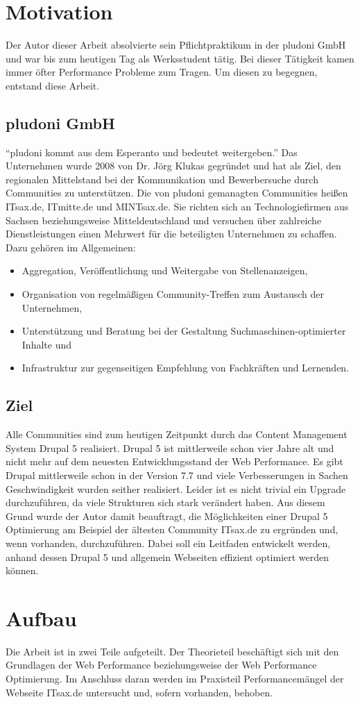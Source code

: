 \section{Motivation}
Der Autor dieser Arbeit absolvierte sein Pflichtpraktikum in der pludoni GmbH und war bis zum heutigen Tag als Werksstudent tätig. Bei dieser T\"atigkeit kamen immer \"ofter Performance Probleme zum Tragen. Um diesen zu begegnen, entstand diese Arbeit.
\subsection{pludoni GmbH}
“pludoni kommt aus dem Esperanto und bedeutet weitergeben.”
Das Unternehmen wurde 2008 von Dr. Jörg Klukas gegründet und hat als Ziel, den regionalen Mittelstand bei der Kommunikation und Bewerbersuche durch Communities zu unterstützen. Die von pludoni gemanagten Communities heißen ITsax.de, ITmitte.de und MINTsax.de. Sie richten sich an Technologiefirmen aus Sachsen beziehungsweise Mitteldeutschland und versuchen über zahlreiche Dienstleistungen einen Mehrwert für die beteiligten Unternehmen zu schaffen. Dazu geh\"oren im Allgemeinen:

\begin{itemize}
 \item Aggregation, Veröffentlichung und Weitergabe von Stellenanzeigen,
 \item Organisation von regelmäßigen Community-Treffen zum Austausch der Unternehmen,
 \item Unterstützung und Beratung bei der Gestaltung Suchmaschinen-optimierter Inhalte und
 \item Infrastruktur zur gegenseitigen Empfehlung von Fachkräften und Lernenden.
\end{itemize}

\subsection{Ziel}
Alle Communities sind zum heutigen Zeitpunkt durch das Content Management System Drupal 5 realisiert. Drupal 5 ist mittlerweile schon vier Jahre alt und nicht mehr auf dem neuesten Entwicklungsstand der Web Performance. Es gibt Drupal mittlerweile schon in der Version 7.7 und viele Verbesserungen in Sachen Geschwindigkeit wurden seither realisiert. Leider ist es nicht trivial ein Upgrade durchzuführen, da viele Strukturen sich stark verändert haben. Aus diesem Grund wurde der Autor damit beauftragt, die Möglichkeiten einer Drupal 5 Optimierung am Beispiel der ältesten Community ITsax.de zu ergründen und, wenn vorhanden, durchzuführen. Dabei soll ein Leitfaden entwickelt werden, anhand dessen Drupal 5 und allgemein Webseiten effizient optimiert werden können.

\section{Aufbau}
Die Arbeit ist in zwei Teile aufgeteilt. Der Theorieteil beschäftigt sich mit den Grundlagen der Web Performance beziehungsweise der Web Performance Optimierung. Im Anschluss daran werden im Praxisteil Performancemängel der Webseite ITsax.de untersucht und, sofern vorhanden, behoben. 

